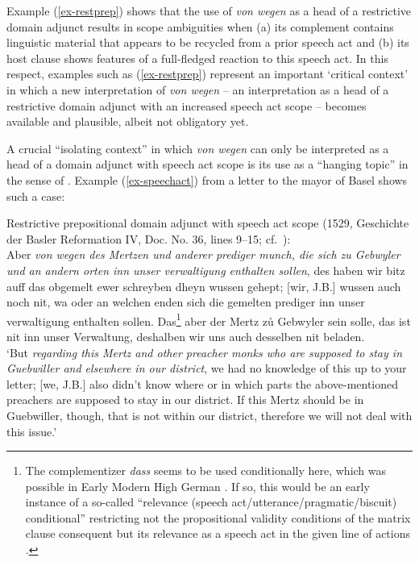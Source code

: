 \documentclass[output=paper
  ,nobabel
  ,draftmode
  ,babelshorthands
  ,colorlinks, citecolor=brown
]{langscibook}
\begin{document}
Example (\ref{ex-restprep}) shows that the use of \emph{von wegen} as a head of a restrictive domain adjunct results in scope ambiguities when (a) its complement contains linguistic material that appears to be recycled from a prior speech act and (b) its host clause shows features of a full-fledged reaction to this speech act. In this respect, examples such as (\ref{ex-restprep}) represent an important `critical context' \citep[cf.][]{Diewald2002} in which a new interpretation of \emph{von wegen} -- an interpretation as a head of a restrictive domain adjunct with an increased speech act scope – becomes available and plausible, albeit not obligatory yet.

A crucial ``isolating context'' \citep{Diewald2002} in which \emph{von wegen} can only be interpreted as a head of a domain adjunct with speech act scope is its use as a ``hanging topic'' in the sense of \citet{Altmann1981}. Example (\ref{ex-speechact}) from a letter to the mayor of Basel shows such a case:

\ea\label{ex-speechact} Restrictive prepositional domain adjunct with speech act scope (1529, Geschichte der Basler Reformation IV, Doc. No. 36, lines 9--15; cf.\ \citealp[34]{Roth1941}):\\
\smallskip
Aber \emph{von wegen des Mertzen und anderer prediger munch, die sich zu Gebwyler und an andern
  orten inn unser verwaltigung enthalten sollen}, des haben wir bitz auff das obgemelt ewer
schreyben dheyn wussen gehept; [wir, J.B.] wussen auch noch nit, wa oder an welchen enden sich die
gemelten prediger inn unser verwaltigung enthalten sollen. Das\footnote{The complementizer
  \emph{dass} seems to be used conditionally here, which was possible in Early Modern High
  German \citep[cf.][821]{GrimmGrimm1860}. If so, this would be an early instance of a so-called “relevance (speech act/utterance/pragmatic/biscuit) conditional” restricting not the propositional validity conditions of the matrix clause consequent but its relevance as a speech act in the given line of actions \citep[e.g.][]{Austin1956, Sweetser1990,Guenthner1999}.}
aber der Mertz zů Gebwyler sein solle, das ist nit inn unser Verwaltung, deshalben wir uns auch desselben nit beladen. \\
	`But \emph{regarding this Mertz and other preacher monks who are supposed to stay in Guebwiller and elsewhere in our district}, we had no knowledge of this up to your letter; [we, J.B.] also didn’t know where or in which parts the above-mentioned preachers are supposed to stay in our district. If this Mertz should be in Guebwiller, though, that is not within our district, therefore we will not deal with this issue.'
\z
\end{document}
